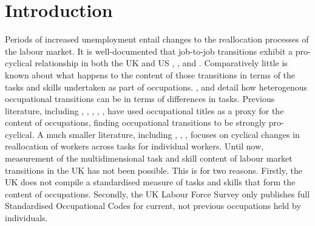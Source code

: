\documentclass[12pt,authoryear]{elsarticle}
\begin{document}
	
	\section{Introduction}
	\label{sec:Introduction}
	
	Periods of increased unemployment entail changes to the reallocation processes of the labour market. It is well-documented that job-to-job transitions exhibit a  pro-cyclical relationship in both the UK and US  \cite{Carrillo-Tudela2016},  \cite{MurphyTopel1987}, \cite{Moscarini2007} and \cite{Kambourov2008}. Comparatively little is known about what happens to the content of those transitions in terms of the tasks and skills undertaken as part of occupations. \cite{Poletaev2008},  \cite{Gathmann2010} and \cite{Yamaguchi2010} detail how heterogenous occupational transitions can be in terms of differences in tasks. Previous literature, including \cite{MurphyTopel1987}, \cite{Moscarini2007}, \cite{Kambourov2008}, \cite{Carrillo-Tudela2014}, \cite{Carrillo-Tudela2016}, have used occupational titles as a proxy for the content of occupations, finding occupational transitions to be strongly pro-cyclical.	A much smaller literature, including \cite{CortesGallipoli}, \cite{Carrillo-Tudela2014}, \cite{Summerfield2016}, focuses on cyclical changes in reallocation of workers across tasks for individual workers. Until now, measurement of the multidimensional task and skill content of labour market transitions in the UK has not been possible. This is for two reasons. Firstly, the UK does not compile a standardised measure of tasks and skills that form the content of occupations. Secondly, the UK Labour Force Survey only publishes full Standardised Occupational Codes for current, not previous occupations held by individuals. 
	
\end{document}
